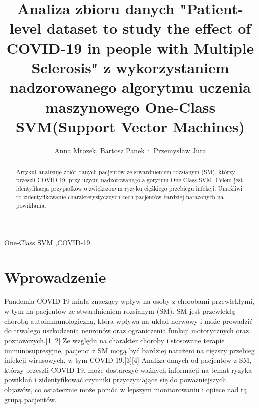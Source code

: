 \documentclass[a4paper,fleqn]{cas-dc}
\begin{document}
\let\WriteBookmarks\relax
\def\floatpagepagefraction{1}
\def\textpagefraction{.001}


\shortauthors{}

\title [mode = title]{Analiza zbioru danych "Patient-level dataset to study the effect of COVID-19 in people with Multiple Sclerosis" z wykorzystaniem nadzorowanego algorytmu uczenia maszynowego One-Class SVM(Support Vector Machines)}                      

\author{Anna Mrozek, Bartosz Panek \,i\, Przemysław Jura  }

\renewcommand{\abstractname}{STRESZCZENIE}
\begin{abstract}
Artykuł analizuje zbiór danych pacjentów ze stwardnieniem rozsianym (SM), którzy przeszli COVID-19, przy użyciu nadzorowanego algorytmu One-Class SVM. Celem jest identyfikacja przypadków o zwiększonym ryzyku ciężkiego przebiegu infekcji. Umożliwi to zidentyfikowanie charakterystycznych cech pacjentów bardziej narażonych na powikłania.
\end{abstract}

\renewcommand{\abstractname}{STRESZCZENIE}
\begin{keywords}
One-Class SVM \sep COVID-19 
\end{keywords}

\maketitle

\section{Wprowadzenie}
Pandemia COVID-19 miała znaczący wpływ na osoby z chorobami przewlekłymi, w tym na pacjentów ze stwardnieniem rozsianym (SM). SM jest przewlekłą chorobą autoimmunologiczną, która wpływa na układ nerwowy i może prowadzić do trwałego uszkodzenia neuronów oraz ograniczenia funkcji motorycznych oraz poznawczych.[1][2] Ze względu na charakter choroby i stosowane terapie immunosupresyjne, pacjenci z SM mogą być bardziej narażeni na cięższy przebieg infekcji wirusowych, w tym COVID-19.[3][4] Analiza danych od pacjentów z SM, którzy przeszli COVID-19, może dostarczyć ważnych informacji na temat ryzyka powikłań i zidentyfikować czynniki przyczyniające się do poważniejszych objawów, co ostatecznie może pomóc w lepszym monitorowaniu i opiece nad tą grupą pacjentów.
\end{document}
